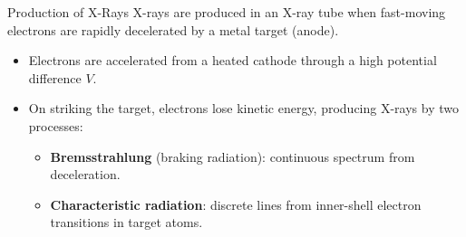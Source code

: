 \begin{definitionbox}{Production of X-Rays}
X-rays are produced in an X-ray tube when fast-moving electrons are rapidly decelerated by a metal target (anode).
\begin{itemize}[itemsep=2pt]
  \item Electrons are accelerated from a heated cathode through a high potential difference $V$.
  \item On striking the target, electrons lose kinetic energy, producing X-rays by two processes:
    \begin{itemize}
      \item \textbf{Bremsstrahlung} (braking radiation): continuous spectrum from deceleration.
      \item \textbf{Characteristic radiation}: discrete lines from inner-shell electron transitions in target atoms.
    \end{itemize}
\end{itemize}
\end{definitionbox}


